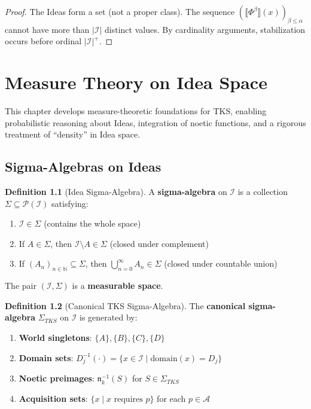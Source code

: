 \documentclass[11pt,twoside,openright]{book}
\theoremstyle{definition}
\newtheorem{definition}{Definition}[chapter]
\theoremstyle{plain}
\theoremstyle{remark}
\newcommand{\sem}[1]{\llbracket #1 \rrbracket}
\newcommand{\Ideas}{\mathcal{I}}
\newcommand{\Acquisitions}{\mathcal{A}}
\newcommand{\TransFrac}[1]{\Phi^{#1}}        %
\newcommand{\SigAlg}{\Sigma}                 %
\newcommand{\vnewtwo}{\textbf{v7.2 New}}
\begin{document}
\begin{proof}
The Ideas form a set (not a proper class). The sequence $(\sem{\TransFrac{\beta}}(x))_{\beta \leq \alpha}$ cannot have more than $|\Ideas|$ distinct values. By cardinality arguments, stabilization occurs before ordinal $|\Ideas|^+$.
\end{proof}


\chapter{Measure Theory on Idea Space}
\label{ch:measure-theory}

\begin{tcolorbox}[colback=blue!5!white,colframe=blue!75!black,title=\vnewtwo]
This chapter develops measure-theoretic foundations for TKS, enabling probabilistic reasoning about Ideas, integration of noetic functions, and a rigorous treatment of ``density'' in Idea space.
\end{tcolorbox}

\section{Sigma-Algebras on Ideas}

\begin{definition}[Idea Sigma-Algebra]
\label{def:idea-sigma-algebra}
A \textbf{sigma-algebra} on $\Ideas$ is a collection $\SigAlg \subseteq \mathcal{P}(\Ideas)$ satisfying:
\begin{enumerate}
  \item $\Ideas \in \SigAlg$ (contains the whole space)
  \item If $A \in \SigAlg$, then $\Ideas \setminus A \in \SigAlg$ (closed under complement)
  \item If $(A_n)_{n \in \mathbb{N}} \subseteq \SigAlg$, then $\bigcup_{n=0}^\infty A_n \in \SigAlg$ (closed under countable union)
\end{enumerate}
The pair $(\Ideas, \SigAlg)$ is a \textbf{measurable space}.
\end{definition}

\begin{definition}[Canonical TKS Sigma-Algebra]
\label{def:canonical-sigma}
The \textbf{canonical sigma-algebra} $\SigAlg_{TKS}$ on $\Ideas$ is generated by:
\begin{enumerate}
  \item \textbf{World singletons}: $\{A\}, \{B\}, \{C\}, \{D\}$
  \item \textbf{Domain sets}: $D_j^{-1}(\cdot) = \{x \in \Ideas \mid \mathrm{domain}(x) = D_j\}$
  \item \textbf{Noetic preimages}: $\mathfrak{n}_k^{-1}(S)$ for $S \in \SigAlg_{TKS}$
  \item \textbf{Acquisition sets}: $\{x \mid x \text{ requires } p\}$ for each $p \in \Acquisitions$
\end{enumerate}
\end{definition}
\end{document}
